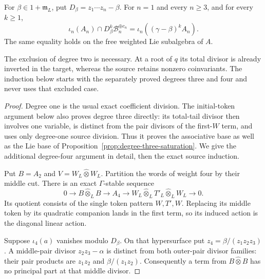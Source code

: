 \begin{theorem}\label{thm:pair-total-saturation}
For $\beta\in1+\mathfrak m_L$, put
$D_\beta=z_1\cdots z_n-\beta$. For $n=1$ and every
$n\geq3$, and for every $k\geq1$,
\[
 \iota_n(A_n)\cap D_\beta^k\mathcal B_n^{\oplus c_n}
                   =\iota_n((\gamma-\beta)^kA_n).
\]
The same equality holds on the free weighted Lie
subalgebra of $A$.
\end{theorem}

The exclusion of degree two is necessary. At a root
of $q$ its total divisor is already inverted in the
target, whereas the source retains nonzero
coinvariants. The induction below starts with the
separately proved degrees three and four and never
uses that excluded case.

\begin{proof}
Degree one is the usual exact coefficient division.
The initial-token argument below also proves degree
three directly: its total-tail divisor then involves
one variable, is distinct from the pair divisors of
the first-$W$ term, and uses only degree-one source
division. Thus it proves the associative base as
well as the Lie base of
Proposition~\ref{prop:degree-three-saturation}.
We give the additional degree-four argument in
detail, then the exact source induction.

Put $B=A_2$ and $V=W_L\widehat\otimes W_L$. Partition
the words of weight four by their middle cut. There
is an exact $\Gamma$-stable sequence
\begin{equation}\label{eq:pair-four-cut}
 0\longrightarrow B\widehat\otimes_L B
 \longrightarrow A_4
 \longrightarrow W_L\widehat\otimes_L T'_L
                    \widehat\otimes_L W_L\longrightarrow0.
\end{equation}
Its quotient consists of the single token pattern
$W,T',W$. Replacing its middle token by its quadratic
companion lands in the first term, so its induced
action is the diagonal linear action.

Suppose $\iota_4(a)$ vanishes modulo $D_\beta$. On
that hypersurface put $z_4=\beta/(z_1z_2z_3)$.
A middle-pair divisor $z_2z_3-\alpha$ is distinct
from both outer-pair divisor families: their pair
products are $z_1z_2$ and $\beta/(z_1z_2)$.
Consequently a term from $B\widehat\otimes B$ has
no principal part at that middle divisor.


\end{proof}
